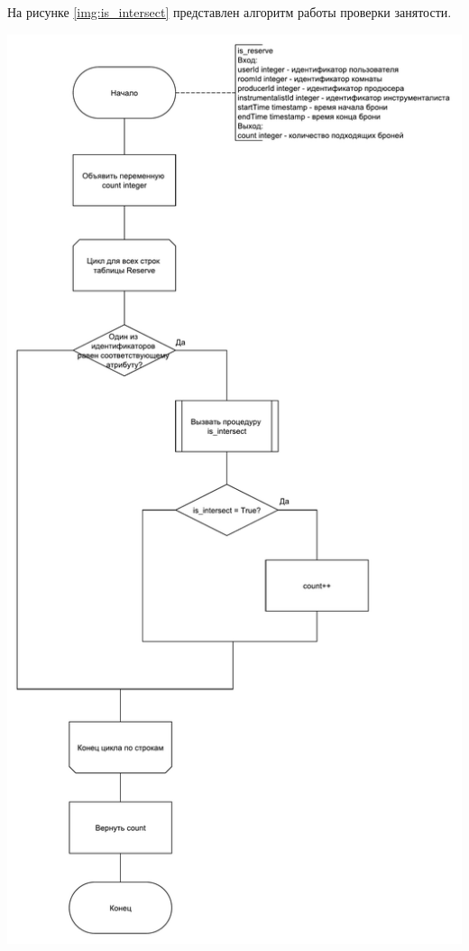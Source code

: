 На рисунке \ref{img:is_intersect} представлен алгоритм работы проверки занятости.
\begin{center}
	\centering
	\includegraphics[height=0.95\textheight]{inc/img/is_reserve.pdf}
	\label{img:is_reserve}
\end{center}

